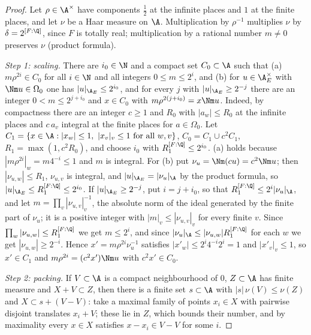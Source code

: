 \begin{proof}
Let $\rho\in\A^\times$ have components $\frac12$ at the infinite places and $1$ at the finite places, and let $\nu$ be a Haar measure on
$\A$. Multiplication by $\rho^{-1}$ multiplies $\nu$ by $\delta=2^{[F:\Q]}$, since $F$ is totally real; multiplication by a rational
number $m\ne0$ preserves $\nu$ (product formula).

\emph{Step 1: scaling.} There are $i_0\in\N$ and a compact set $C_0\subset\A$ such that (a) $m\rho^{2i}\in C_0$ for all $i\in\N$ and all
integers $0\le m\le2^i$, and (b) for $u\in\tliftAE^\times$ with $\Nm u\in\Omega_0$ one has $|u|_{\tliftAE}\le2^{i_0}$, and for every $j$ with
$|u|_{\tliftAE}\ge2^{-j}$ there are an integer $0<m\le2^{j+i_0}$ and $x\in C_0$ with $m\rho^{2(j+i_0)}=x\Nm u$. Indeed, by compactness there
are an integer $c\ge1$ and $R_0$ with $|a_w|\le R_0$ at the infinite places and $c\,a_v$ integral at the finite places for $a\in\Omega_0$. Let
$C_1=\{x\in\A:|x_w|\le1,\ |x_v|_v\le1\text{ for all }w,v\}$, $C_0=C_1\cup c^2C_1$, $R_1=\max(1,c^2R_0)$, and choose $i_0$ with
$R_1^{[F:\Q]}\le2^{i_0}$. (a) holds because $|m\rho^{2i}|_w=m4^{-i}\le1$ and $m$ is integral. For (b) put $\nu_u=\Nm(cu)=c^2\Nm u$; then
$|\nu_{u,w}|\le R_1$, $\nu_{u,v}$ is integral, and $|u|_{\tliftAE}=|\nu_u|_\A$ by the product formula, so
$|u|_{\tliftAE}\le R_1^{[F:\Q]}\le2^{i_0}$. If $|u|_{\tliftAE}\ge2^{-j}$, put $i=j+i_0$, so that $R_1^{[F:\Q]}\le2^i|\nu_u|_\A$, and let
$m=\prod_v|\nu_{u,v}|_v^{-1}$, the absolute norm of the ideal generated by the finite part of $\nu_u$; it is a positive integer with
$|m|_v\le|\nu_{u,v}|_v$ for every finite $v$. Since $\prod_w|\nu_{u,w}|\le R_1^{[F:\Q]}$ we get $m\le2^i$, and since
$|\nu_u|_\A\le|\nu_{u,w}|R_1^{[F:\Q]}$ for each $w$ we get $|\nu_{u,w}|\ge2^{-i}$. Hence $x'=m\rho^{2i}\nu_u^{-1}$ satisfies
$|x'_w|\le2^i4^{-i}2^i=1$ and $|x'_v|_v\le1$, so $x'\in C_1$ and $m\rho^{2i}=(c^2x')\Nm u$ with $c^2x'\in C_0$.

\emph{Step 2: packing.} If $V\subset\A$ is a compact neighbourhood of $0$, $Z\subset\A$ has finite measure and $X+V\subset Z$, then there is a
finite set $s\subset\A$ with $|s|\,\nu(V)\le\nu(Z)$ and $X\subset s+(V-V)$: take a maximal family of points $x_i\in X$ with pairwise
disjoint translates $x_i+V$; these lie in $Z$, which bounds their number, and by maximality every $x\in X$ satisfies
$x-x_i\in V-V$ for some $i$.


\end{proof}
